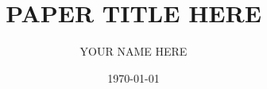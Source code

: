 \documentclass[letterpaper, 11pt]{article}
\newcommand{\1}{\mathds{1}}		%
\theoremstyle{definition}
\begin{document}

\title{\normalsize\MakeUppercase{\bfseries 
Paper title here}}
\author{\small\MakeUppercase{
Your name here}}
\date{\footnotesize\MakeUppercase\today}
\maketitle
\vspace{-1cm}









\end{document}
